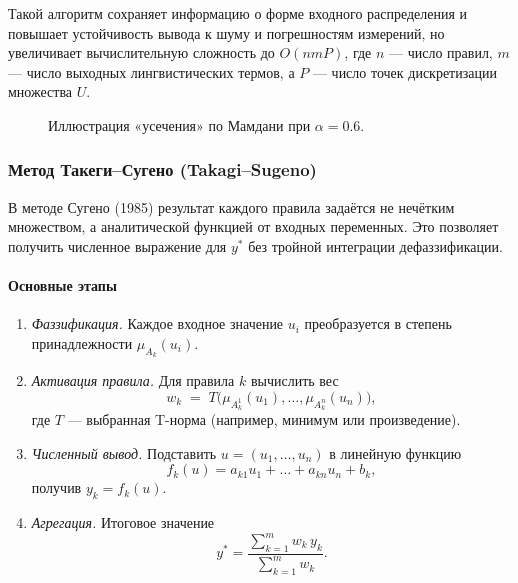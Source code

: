 Такой алгоритм сохраняет информацию о форме входного распределения и повышает устойчивость вывода к шуму и погрешностям измерений, но увеличивает вычислительную сложность до $O(nmP)$, где $n$ — число правил, $m$ — число выходных лингвистических термов, а $P$ — число точек дискретизации множества $U$.

\begin{figure}[H]
  \centering
  \caption{Иллюстрация «усечения» по Мамдани при $\alpha=0.6$.}
\end{figure}


\subsubsection{Метод Такеги–Сугено (Takagi–Sugeno)}
\label{subsubsec:sugeno}

В методе Сугено (1985) результат каждого правила задаётся не нечётким множеством, а аналитической функцией от входных переменных. Это позволяет получить численное выражение для $y^*$ без тройной интеграции дефаззификации.

\paragraph{Основные этапы}
\begin{enumerate}
  \item \emph{Фаззификация.} Каждое входное значение $u_i$ преобразуется в степень принадлежности $\mu_{A_k}(u_i)$.
  \item \emph{Активация правила.} Для правила $k$ вычислить вес
    \[
      w_k \;=\; T\bigl(\mu_{A_k^1}(u_1),\dots,\mu_{A_k^n}(u_n)\bigr),
    \]
    где $T$ — выбранная T-норма (например, минимум или произведение).
  \item \emph{Численный вывод.} Подставить $u=(u_1,\dots,u_n)$ в линейную функцию
    \[
      f_k(u) = a_{k1}u_1 + \dots + a_{kn}u_n + b_k,
    \]
    получив $y_k = f_k(u)$.
  \item \emph{Агрегация.} Итоговое значение
    \[
      y^* = \frac{\sum_{k=1}^m w_k\,y_k}{\sum_{k=1}^m w_k}.
    \]
\end{enumerate}

